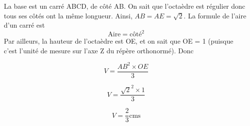 \documentclass[answers]{exam}
\begin{document}
\begin{questions}
\begin{solution}
  La base est un carré ABCD, de côté AB. On sait que l'octaèdre est régulier donc tous ses côtés ont la même longueur. Ainsi, $AB = AE = \sqrt{2}$. La formule de l'aire d'un carré est 
  \[\text{Aire} = \text{côté}^2\]
  Par ailleurs, la hauteur de l'octaèdre est OE, et on sait que OE = 1 (puisque c'est l'unité de mesure sur l'axe Z du répère orthonormé). Donc

  \[
    V = \frac{ AB^2 \times OE }{3}
    \]


  \[
    V = \frac{ \sqrt{2}^2 \times 1 }{3}
    \]

\[
    V = \frac{2}{3} \text{cms}
    \]
  \end{solution}
\end{questions} 
\end{document}
